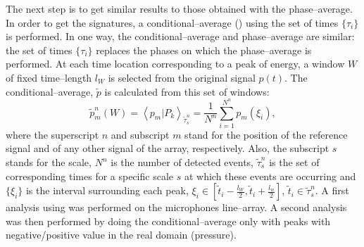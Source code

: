The next step is to get similar results to those obtained with the phase--average. In order to get the signatures, a conditional--average () using the set of times $\{\tau_{i}\}$ is performed. In one way, the conditional--average and phase--average are similar: the set of times $\{\tau_{i}\}$ replaces the phases on which the phase--average is performed. At each time location corresponding to a peak of energy, a window $W$ of fixed time--length $l_{W}$ is selected from the original signal $p \left( t \right)$. The conditional--average, $\tilde{p}$ is calculated from this set of windows:
\begin{equation} \label{eqn:ensembleAverage}
	\tilde{p}^n_{m}\left( W \right) = \left< p_{m} | P_{k} \right>_{\tilde{\tau}^n_{s}} = \frac{1}{N^n} \sum^{N^n}_{i = 1} p_{m}\left(\xi_{i}\right),
\end{equation}
where the superscript $n$ and subscript $m$ stand for the position of the reference signal and of any other signal of the array, respectively. Also, the subscript $s$ stands for the scale, $N^n$ is the number of detected events, $\tilde{\tau}^n_{s}$ is the set of corresponding times for a specific scale $s$ at which these events are occurring and $\{\xi_{i}\}$ is the interval surrounding each peak, $\xi_{i} \in \left[ \tilde{t}_{i} - \frac{l_W}{2}, \tilde{t}_{i} + \frac{l_w}{2} \right]$, $\tilde{t}_{i} \in \tilde{\tau}^n_{s}$.
A first analysis using  was performed on the microphones line--array. A second analysis was then performed by doing the conditional--average only with peaks with negative/positive value in the real domain (pressure).

